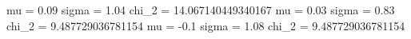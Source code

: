  mu = 0.09 sigma = 1.04 chi_2 = 14.067140449340167 mu = 0.03 sigma = 0.83 chi_2 = 9.487729036781154 mu = -0.1 sigma = 1.08 chi_2 = 9.487729036781154